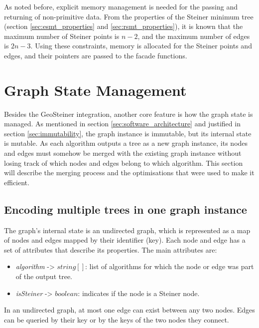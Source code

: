 \documentclass{l4proj}
\begin{document}
As noted before, explicit memory management is needed for the passing and returning of non-primitive data. From the properties of the Steiner minimum tree (section \ref{sec:esmt_properties} and \ref{sec:rsmt_properties}), it is known that the maximum number of Steiner points is $n - 2$, and the maximum number of edges is $2n - 3$. Using these constraints, memory is allocated for the Steiner points and edges, and their pointers are passed to the facade functions.

\section{Graph State Management}
\label{sec:graph_state_management}
Besides the GeoSteiner integration, another core feature is how the graph state is managed. As mentioned in section \ref{sec:software_architecture} and justified in section \ref{sec:immutability}, the graph instance is immutable, but its internal state is mutable.
As each algorithm outputs a tree as a new graph instance, its nodes and edges must somehow be merged with the existing graph instance without losing track of which nodes and edges belong to which algorithm. This section will describe the merging process and the optimisations that were used to make it efficient.

\subsection{Encoding multiple trees in one graph instance}
The graph's internal state is an undirected graph, which is represented as a map of nodes and edges mapped by their identifier (key). Each node and edge has a set of attributes that describe its properties. The main attributes are:
\begin{itemize}
    \item \textit{algorithm} -> $string[]$: list of algorithms for which the node or edge was part of the output tree.
    \item \textit{isSteiner} -> $boolean$: indicates if the node is a Steiner node.
\end{itemize}
In an undirected graph, at most one edge can exist between any two nodes. Edges can be queried by their key or by the keys of the two nodes they connect.
\end{document}
